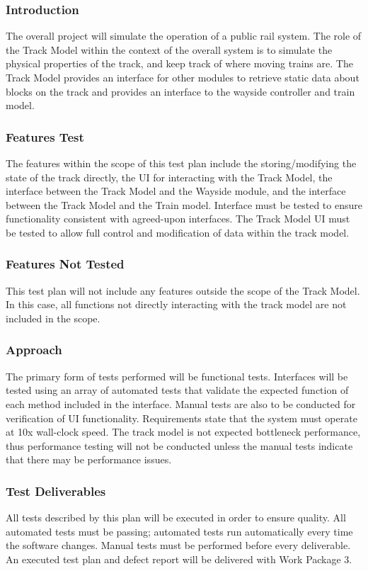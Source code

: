 \documentclass{scrreprt}
\begin{document}
\subsubsection{Introduction}
The overall project will simulate the operation of a public rail system. The role of the Track Model within the context of the overall system is to simulate the physical properties of the track, and keep track of where moving trains are. The Track Model provides an interface for other modules to retrieve static data about blocks on the track and provides an interface to the wayside controller and train model.

\subsubsection{Features Test}
The features within the scope of this test plan include the storing/modifying the state of the track directly, the UI for interacting with the Track Model, the interface between the Track Model and the Wayside module, and the interface between the Track Model and the Train model. Interface must be tested to ensure functionality consistent with agreed-upon interfaces. The Track Model UI must be tested to allow full control and modification of data within the track model.

\subsubsection{Features Not Tested}
This test plan will not include any features outside the scope of the Track Model. In this case, all functions not directly interacting with the track model are not included in the scope.

\subsubsection{Approach}
The primary form of tests performed will be functional tests. Interfaces will be tested using an array of automated tests that validate the expected function of each method included in the interface. Manual tests are also to be conducted for verification of UI functionality. Requirements state that the system must operate at 10x wall-clock speed. The track model is not expected bottleneck performance, thus performance testing will not be conducted unless the manual tests indicate that there may be performance issues.

\subsubsection{Test Deliverables}
All tests described by this plan will be executed in order to ensure quality. All automated tests must be passing; automated tests run automatically every time the software changes. Manual tests must be performed before every deliverable. An executed test plan and defect report will be delivered with Work Package 3.
\end{document}
